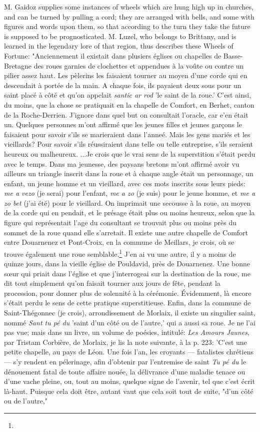 \documentclass[a4paper, 11pt, oneside, polutonikogreek, english]{article}
\begin{document}
M. Gaidoz supplies some instances of wheels which are hung high up in churches, and can be turned by pulling a cord; they are arranged with bells, and some with figures and words upon them, so that according to the turn they take the future is supposed to be prognosticated. M. Luzel, who belongs to Brittany, and is learned in the legendary lore of that region, thus describes these Wheels of Fortune: "Anciennement il existait dans plusiers églises ou chapelles de Basse-Bretagne des roues garnies de clochettes et appendues à la voûte ou contre un pilier assez haut. Les pèlerins les faisaient tourner au moyen d'une corde qui en descendait à portée de la main. A chaque fois, ils payaient deux sous pour un saint placé à côté et qu'on appelait \emph{santic ar rod} 'le saint de la roue.' C'est ainsi, du moins, que la chose se pratiquait en la chapelle de Comfort, en Berhet, canton de la Roche-Derrien. J'ignore dans quel but on consultait l'oracle, car e'en était un. Quelques personnes m'ont affirmé que les jeunes filles et jeunes garçons le faisaient pour savoir s'ils se marieraient dans l'anneé. Mais les gens mariés et les vieillards? Pour savoir s'ils réussiraient dans telle ou telle entreprise, s'ils seraient heureux ou malheureux. ...Je crois que le vrai sens de la superstition s'était perdu avec le temps. Dans ma jeunesse, des paysans bretons m'ont affirmé avoir vu ailleurs un triangle inscrit dans la roue et à chaque angle était un personnage, un enfant, un jeune homme et un vieillard, avec ces mots inscrits sous leurs pieds: \emph{me a vezo} (je serai) pour l'enfant, \emph{me a zo} (je suis) pour le jeune homme, et \emph{me a zo bet} (j'ai été) pour le vieillard. On imprimait une secousse à la roue, au moyen de la corde qui en pendait, et le présage était plus ou moins heureux, selon que la figure qui représentait l'age du consultant se trouvait plus ou moins près du sommet de la roue quand elle s'arretait. Il existe une autre chapelle de Comfort entre Douarnenez et Pont-Croix, en la commune de Meillars, je crois, où se trouve également une roue semblable.\footnote{} J'en ai vu une autre, il y a moins de quinze jours, dans la vieille église de Pouldavid, près de Douarnenez. Une bonne sœur qui priait dans l'église et que j'interrogeai sur la destination de la roue, me dit tout simplement qu'on faisait tourner aux jours de fête, pendant la procession, pour donner plus de solennité à la cérémonie. Évidemment, là encore s'était perdu le sens de cette pratique superstitieuse. Enfin, dans la commune de Saint-Thégonnec (je crois), arrondissement de Morlaix, il existe un singulier saint, nommé \emph{Sant tu pé du} 'saint d'un côté ou de l'autre,' qui a aussi sa roue. Je ne l'ai pas vue; mais dans un livre, un volume de poésies, intitulé: \emph{Les Amours Jaunes}, par Tristam Corbière, de Morlaix, je lis la note suivante, à la p. 223: 'C'est une petite chapelle, au pays de Léon. Une fois l'an, les croyants --- fatalistes chrétiens --- s'y rendent en pélerinage, afin d'obtenir par l'entremise de saint \emph{Tu pé du} le dénouement fatal de toute affaire nouée, la délivrance d'une maladie tenace ou d'une vache pleine, ou, tout au moins, quelque signe de l'avenir, tel que c'est écrit là-haut. Puisque cela doit être, autant vaut que cela soit tout de suite, "d'un côté ou de l'autre," 
\end{document}
